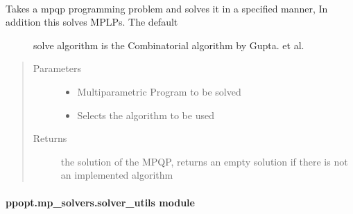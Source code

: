 \documentclass[letterpaper,10pt,english]{sphinxmanual}
\begin{document}
\begin{fulllineitems}
\label{\detokenize{ppopt.mp_solvers:ppopt.mp_solvers.solve_mpqp.solve_mpqp}}~\begin{description}
\item[{Takes a mpqp programming problem and solves it in a specified manner, In addition this solves MPLPs. The default}] \leavevmode
\sphinxAtStartPar
solve algorithm is the Combinatorial algorithm by Gupta. et al.

\end{description}
\begin{quote}\begin{description}
\item[{Parameters}] \leavevmode\begin{itemize}
\item {} 
\sphinxAtStartPar
{} \textendash{} Multiparametric Program to be solved

\item {} 
\sphinxAtStartPar
{} \textendash{} Selects the algorithm to be used

\end{itemize}

\item[{Returns}] \leavevmode
\sphinxAtStartPar
the solution of the MPQP, returns an empty solution if there is not an implemented algorithm

\end{description}\end{quote}

\end{fulllineitems}



\paragraph{ppopt.mp\_solvers.solver\_utils module}
\label{\detokenize{ppopt.mp_solvers:module-ppopt.mp_solvers.solver_utils}}\label{\detokenize{ppopt.mp_solvers:ppopt-mp-solvers-solver-utils-module}}
\end{document}
